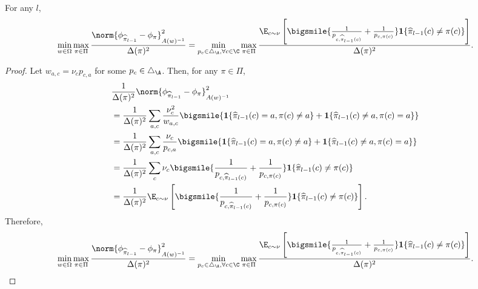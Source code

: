 \documentclass{article}
\newcommand{\pill}{\widehat{\pi}_{l-1}}
\newcommand{\1}{\mathbf{1}}
\begin{document}
\begin{lemma}\label{lem:B_3}
For any $l$, 
\[\min_{w\in\Omega}\max_{\pi\in\Pi}\frac{\norm{\phi_{\pill}-\phi_\pi}_{A(w)^{-1}}^2}{\Delta(\pi)^2}=\min_{p_c\in\triangle_\A,\forall c\in\C}\max_{\pi\in\Pi}\frac{\E_{c\sim\nu}\left[\bigsmile{\frac{1}{p_{c,\pill(c)}}+\frac{1}{p_{c,\pi(c)}}}\1\{\pill(c)\ne\pi(c)\}\right]}{\Delta(\pi)^2}.\]
\end{lemma}
\begin{proof}
Let $w_{a,c}=\nu_c p_{c,a}$ for some $p_c\in\triangle_\A$. Then, for any $\pi\in\Pi$, 
\begin{align*}
    &\frac{1}{\Delta(\pi)^2}\norm{\phi_{\pill}-\phi_\pi}_{A(w)^{-1}}^2\\
    &=\frac{1}{\Delta(\pi)^2}\sum_{a,c}\frac{\nu_c^2}{w_{a,c}}\bigsmile{\1\{\pill(c)=a,\pi(c)\ne a\}+\1\{\pill(c)\ne a,\pi(c)=a\}}\\
    &=\frac{1}{\Delta(\pi)^2}\sum_{a,c}\frac{\nu_c}{p_{c,a}}\bigsmile{\1\{\pill(c)=a,\pi(c)\ne a\}+\1\{\pill(c)\ne a,\pi(c)=a\}}\\
    &= \frac{1}{\Delta(\pi)^2}\sum_{c}\nu_c\bigsmile{\frac{1}{p_{c,\pill(c)}}+\frac{1}{p_{c,\pi(c)}}}\1\{\pill(c)\ne\pi(c)\}\\
    &=\frac{1}{\Delta(\pi)^2}\E_{c\sim\nu}\left[\bigsmile{\frac{1}{p_{c,\pill(c)}}+\frac{1}{p_{c,\pi(c)}}}\1\{\pill(c)\ne\pi(c)\}\right].
\end{align*}
Therefore, \[\min_{w\in\Omega}\max_{\pi\in\Pi}\frac{\norm{\phi_{\pill}-\phi_\pi}_{A(w)^{-1}}^2}{\Delta(\pi)^2}=\min_{p_c\in\triangle_\A,\forall c\in\C}\max_{\pi\in\Pi}\frac{\E_{c\sim\nu}\left[\bigsmile{\frac{1}{p_{c,\pill(c)}}+\frac{1}{p_{c,\pi(c)}}}\1\{\pill(c)\ne\pi(c)\}\right]}{\Delta(\pi)^2}.\]

\end{proof}
\end{document}
